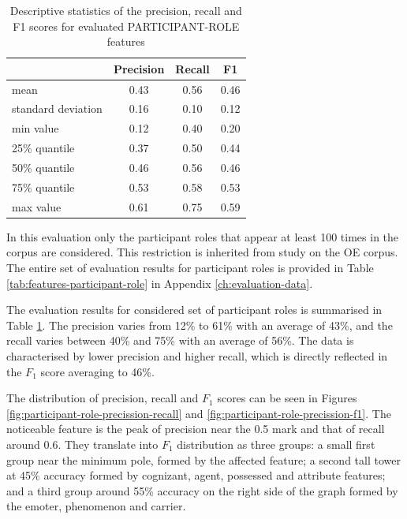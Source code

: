     \begin{table}[!b]
    \centering
    \begin{tabular}{lccc}
        \toprule
        {} & {Precision} & {Recall} & {F1} \\ %
        \midrule
        mean & 0.43 & 0.56 & 0.46 \\
        standard deviation & 0.16 & 0.10 & 0.12 \\
        min value & 0.12 & 0.40 & 0.20 \\
        25\% quantile & 0.37 & 0.50 & 0.44 \\
        50\% quantile & 0.46 & 0.56 & 0.46 \\
        75\% quantile & 0.53 & 0.58 & 0.53 \\
        max value & 0.61 & 0.75 & 0.59 \\
        \bottomrule
    \end{tabular}
    \caption{Descriptive statistics of the precision, recall and F1 scores for evaluated PARTICIPANT-ROLE features}
    \label{tab:features-participant-role-accuracy}
    \end{table}
    
    In this evaluation only the participant roles that appear at least 100 times in the corpus are considered. This restriction is inherited from \citet[160-162]{schulz2015me} study on the OE corpus. The entire set of evaluation results for participant roles is provided in Table \ref{tab:features-participant-role} in Appendix \ref{ch:evaluation-data}. 
    
    The evaluation results for considered set of participant roles is summarised in Table \ref{tab:features-participant-role-accuracy}. The precision varies from 12\% to 61\% with an average of 43\%, and the recall varies between 40\% and 75\% with an average of 56\%. The data is characterised by lower precision and higher recall, which is directly reflected in the $F_1$ score averaging to 46\%. 
    
    The distribution of precision, recall and $F_1$ scores can be seen in Figures \ref{fig:participant-role-precission-recall} and \ref{fig:participant-role-precission-f1}. The noticeable feature is the peak of precision near the 0.5 mark and that of recall around 0.6. They translate into $F_1$ distribution as three groups: a small first group near the minimum pole, formed by the affected feature; a second tall tower at 45\% accuracy formed by cognizant, agent, possessed and attribute features; and a third group around 55\% accuracy on the right side of the graph formed by the emoter, phenomenon and carrier.
    
